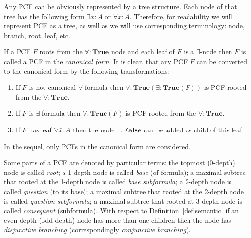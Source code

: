 \documentclass[runningheads,a4paper]{llncs}
\begin{document}
Any PCF can be obviously represented by a tree structure. Each node of that tree has the following form $\exists \bar{x}\colon A$ or $\forall \bar{x}\colon A$. Therefore, for readability we will represent PCF as a tree, as well as we will use corresponding terminology: node, branch, root, leaf, etc.


If a PCF $F$ roots from the $\forall\colon\boldsymbol{True}$ node and each leaf of $F$ is a $\exists$-node then $F$ is called a PCF in the {\em canonical form}.
It is clear, that any PCF $F$ can be converted to the canonical form by the following transformations:
\begin{enumerate}
\item If $F$ is not canonical $\forall$-formula then $\forall\colon \boldsymbol{True}\left(\exists\colon \boldsymbol{True}\left(F\right)\right)$ is PCF rooted from the $\forall\colon\boldsymbol{True}$.
\item If $F$ is $\exists$-formula then $\forall\colon \boldsymbol{True}\left(F\right)$ is PCF rooted from the $\forall\colon\boldsymbol{True}$.
\item If $F$ has leaf $\forall \bar{x}\colon A$ then the node $\exists\colon\boldsymbol{False}$ can be added as child of this leaf.
\end{enumerate}

In the sequel, only PCFs in the canonical form are considered.


Some parts of a PCF are denoted by particular terms: the topmost (0-depth) node is called {\em root}; a 1-depth node is called {\em base} (of formula); a maximal subtree that rooted at the 1-depth node is called {\em base subformula}; a 2-depth node is called {\em question} (to its base); a maximal subtree that rooted at the 2-depth node is called {\em question subformula}; a maximal subtree that rooted at 3-depth node is called {\em consequent} (subformula). With respect to Definition~\ref{def:semantic} if an even-depth (odd-depth) node has more than one children then the node has {\em disjunctive branching} (correspondingly {\em conjunctive branching}).%
\end{document}
